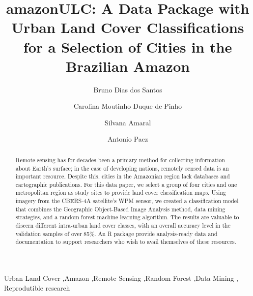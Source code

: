 \documentclass[preprint, 3p,
authoryear]{elsarticle} %
\begin{document}
\begin{frontmatter}

  \title{amazonULC: A Data Package with Urban Land Cover Classifications
for a Selection of Cities in the Brazilian Amazon}
    \author[National Institute for Space Research (INPE)]{Bruno Dias dos
Santos%
  }
    \author[Federal University of ABC (UFABC)]{Carolina Moutinho Duque
de Pinho%
  }
    \author[National Institute for Space Research (INPE)]{Silvana
Amaral%
  }
    \author[McMaster University]{Antonio Paez%
  }
  
  \begin{abstract}
  Remote sensing has for decades been a primary method for collecting
  information about Earth's surface; in the case of developing nations,
  remotely sensed data is an important resource. Despite this, cities in
  the Amazonian region lack databases and cartographic publications. For
  this data paper, we select a group of four cities and one metropolitan
  region as study sites to provide land cover classification maps. Using
  imagery from the CBERS-4A satellite's WPM sensor, we created a
  classification model that combines the Geographic Object-Based Image
  Analysis method, data mining strategies, and a random forest machine
  learning algorithm. The results are valuable to discern different
  intra-urban land cover classes, with an overall accuracy level in the
  validation samples of over 85\%. An R package provide analysis-ready
  data and documentation to support researchers who wish to avail
  themselves of these resources.
  \end{abstract}
    \begin{keyword}
    Urban Land Cover \sep Amazon \sep Remote Sensing \sep Random
Forest \sep Data Mining \sep 
    Reprodutible research
  \end{keyword}
  
 \end{frontmatter}
\end{document}
